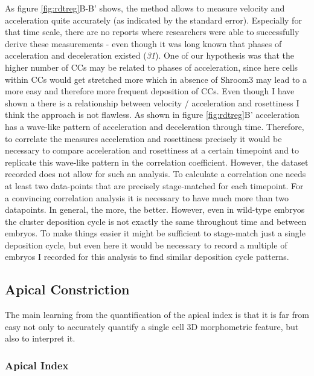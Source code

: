 \documentclass[10pt, b5paper, singlespacinge, twoside]{reedthesis} %
\theoremstyle{definition}
\theoremstyle{definition}
\theoremstyle{definition}
\theoremstyle{remark}
\begin{document}
As figure \ref{fig:rdtreg}B-B' shows, the method allows to measure velocity and acceleration quite accurately (as indicated by the standard error). Especially for that time scale, there are no reports where researchers were able to successfully derive these measurements - even though it was long known that phases of acceleration and deceleration existed (\emph{31}). One of our hypothesis was that the higher number of CCs may be related to phases of acceleration, since here cells within CCs would get stretched more which in absence of Shroom3 may lead to a more easy and therefore more frequent deposition of CCs. Even though I have shown a there is a relationship between velocity / acceleration and rosettiness I think the approach is not flawless. As shown in figure \ref{fig:rdtreg}B' acceleration has a wave-like pattern of acceleration and deceleration through time. Therefore, to correlate the measures acceleration and rosettiness precisely it would be necessary to compare acceleration and rosettiness at a certain timepoint and to replicate this wave-like pattern in the correlation coefficient. However, the dataset recorded does not allow for such an analysis. To calculate a correlation one needs at least two data-points that are precisely stage-matched for each timepoint. For a convincing correlation analysis it is necessary to have much more than two datapoints. In general, the more, the better. However, even in wild-type embryos the cluster deposition cycle is not exactly the same throughout time and between embryos. To make things easier it might be sufficient to stage-match just a single deposition cycle, but even here it would be necessary to record a multiple of embryos I recorded for this analysis to find similar deposition cycle patterns.

\hypertarget{apical-constriction-3}{%
\subsection{Apical Constriction}\label{apical-constriction-3}}

The main learning from the quantification of the apical index is that it is far from easy not only to accurately quantify a single cell 3D morphometric feature, but also to interpret it.

\hypertarget{apical-index}{%
\subsubsection{Apical Index}\label{apical-index}}
\end{document}
